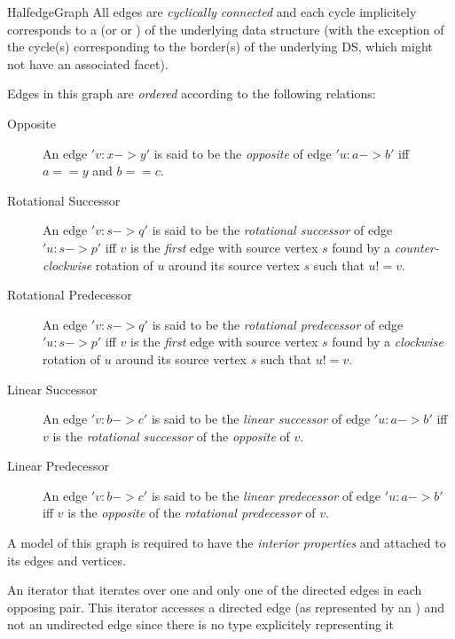 \begin{ccRefConcept}{HalfedgeGraph}
All edges are {\em cyclically connected} and each cycle implicitely
corresponds to a  (or  or ) of the
underlying data structure (with the exception of the cycle(s)
corresponding to the border(s) of the underlying DS, which might not
have an associated facet).

Edges in this graph are {\em ordered} according to the following relations:

\begin{description}

\item[Opposite] 
An edge $'v: x->y'$ is said to be the {\em opposite} of edge $'u: a->b'$ 
iff $a==y$ and $b==c$.

\item[Rotational Successor] 
An edge $'v: s->q'$ is said to be the {\em rotational successor} 
of edge $'u: s->p'$ iff $v$ is the {\em first} edge with source vertex $s$
found by a {\em counter-clockwise} rotation of $u$ around its source 
vertex $s$ such that $u!=v$.
 
\item[Rotational Predecessor] 
An edge $'v: s->q'$ is said to be the {\em rotational predecessor}
of edge $'u: s->p'$ iff $v$ is the {\em first} edge with source vertex $s$
found by a {\em clockwise} rotation of $u$ around its source vertex $s$
such that $u!=v$.

\item[Linear Successor] 
An edge $'v: b->c'$ is said to be the {\em linear successor} of edge 
$'u:a->b'$ iff $v$ is the {\em rotational successor} of the 
{\em opposite} of $v$.
 
\item[Linear Predecessor] 
An edge $'v: b->c'$ is said to be the {\em linear predecessor} of edge 
$'u:a->b'$ iff $v$ is the {\em opposite} of the {\em rotational predecessor}
of $v$.

\end{description}

\ccRefines
{}

A model of this graph is required to have the {\em interior properties}  and  attached to its edges and vertices.

\ccTypes
  {An iterator that iterates over one and only one of the directed edges
  in each opposing pair. This iterator accesses a directed edge 
  (as represented by an ) and not an undirected edge 
  since there is no type explicitely representing it}{}


\end{ccRefConcept}
